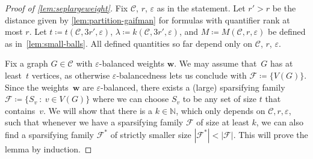 \documentclass[a4paper,UKenglish,cleveref, autoref, thm-restate]{lipics-v2021}
\newcommand{\eps}{\varepsilon}
\newcommand{\N}[0]{\mathrm{\mathbb{N}}}
\newcommand{\weight}{\mathbf{w}}
\newcommand{\CC}{\mathcal{C}}
\newcommand{\FF}{\mathcal{F}}
\begin{document}
\begin{proof}[Proof of \cref{lem:seplargeweight}]
Fix $\CC$, $r$, $\eps$ as in the statement.
Let $r' > r$  be the distance given by \cref{lem:partition-gaifman} for formulas with quantifier rank at most $r$.
Let $t \coloneqq t(\CC,3r',\eps)$, $\lambda \coloneqq k(\CC,3r',\eps)$, and $M \coloneqq M(\CC,r,\eps)$ be defined as in~\cref{lem:small-balls}.
All defined quantities so far depend only on $\CC$, $r$, $\eps$.

Fix a graph $G \in \CC$ with $\eps$-balanced weights $\weight$.
We may assume that~$G$ has at least~$t$ vertices, as otherwise $\eps$-balancedness lets us conclude with $\FF \coloneqq \{V(G)\}$.
Since the weights~$\weight$ are $\eps$-balanced, there exists a (large) sparsifying family $\FF \coloneqq \{ S_v~\colon~v \in V(G) \}$ where we can choose $S_v$ to be any set of size $t$ that contains~$v$.
We will show that there is a $k\in\N$, which only depends on $\CC,r,\eps$, such that whenever we have a sparsifying family $\FF$ of size at least $k$, we can also find a sparsifying family $\FF^*$ of strictly smaller size $|\FF^*| < |\FF|$.
This will prove the lemma by induction.


\end{proof}
\end{document}
